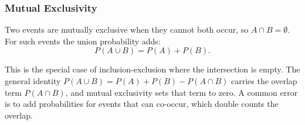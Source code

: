 \subsubsection{Mutual Exclusivity}

\begin{definition}
Two events are mutually exclusive when they cannot both occur, so $A \cap B = \emptyset$. For such events the union probability adds:
\[
P(A \cup B) = P(A) + P(B).
\]
\end{definition}

This is the special case of inclusion-exclusion where the intersection is empty. The general identity $P(A \cup B) = P(A) + P(B) - P(A \cap B)$ carries the overlap term $P(A \cap B)$, and mutual exclusivity sets that term to zero. A common error is to add probabilities for events that can co-occur, which double counts the overlap.
